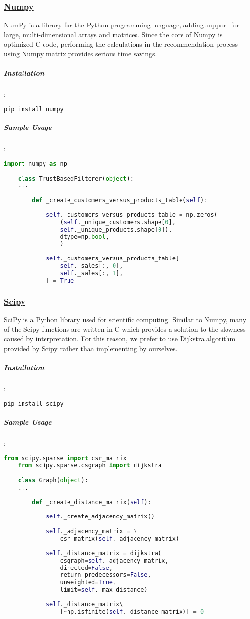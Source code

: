 	\subsubsection{\href{https://numpy.org/}{Numpy}}
	NumPy is a library for the Python programming language, adding support for large, multi-dimensional arrays and matrices. Since the core of Numpy is optimized C code, performing the calculations in the recommendation process using Numpy matrix provides serious time savings.
	\subparagraph{Installation}:
	\begin{lstlisting}[language=bash]
	pip install numpy
	\end{lstlisting}
	
	\subparagraph{Sample Usage}:
	\begin{lstlisting}[language=python, caption=Numpy example]
	import numpy as np
	
	class TrustBasedFilterer(object):
	...
	
		def _create_customers_versus_products_table(self):
	
			self._customers_versus_products_table = np.zeros(
				(self._unique_customers.shape[0],
				self._unique_products.shape[0]),
				dtype=np.bool,
				)
	
			self._customers_versus_products_table[
				self._sales[:, 0],
				self._sales[:, 1],
			] = True
	\end{lstlisting}
	
	\subsubsection{\href{https://www.scipy.org/}{Scipy}}
	SciPy is a Python library used for scientific computing. Similar to Numpy, many of the Scipy functions are written in C which provides a solution to the slowness caused by interpretation. For this reason, we prefer to use Dijkstra algorithm provided by Scipy rather than implementing by ourselves.
	\subparagraph{Installation}:
	\begin{lstlisting}[language=bash]
	pip install scipy
	\end{lstlisting}
	
	\subparagraph{Sample Usage}:
	\begin{lstlisting}[language=python, caption=Scipy example]
	from scipy.sparse import csr_matrix
	from scipy.sparse.csgraph import dijkstra
	
	class Graph(object):
	...
	
		def _create_distance_matrix(self):
	
			self._create_adjacency_matrix()
	
			self._adjacency_matrix = \
				csr_matrix(self._adjacency_matrix)
	
			self._distance_matrix = dijkstra( 
				csgraph=self._adjacency_matrix, 
				directed=False, 
				return_predecessors=False, 
				unweighted=True,
				limit=self._max_distance)
	
			self._distance_matrix\ 
				[~np.isfinite(self._distance_matrix)] = 0
	\end{lstlisting}
